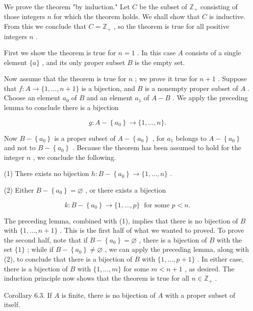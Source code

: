 \documentclass[10pt]{article}
\begin{document}
We prove the theorem "by induction." Let \(C\) be the subset of \({\mathbb{Z}}_{ + }\) consisting of those integers \(n\) for which the theorem holds. We shall show that \(C\) is inductive. From this we conclude that \(C = {\mathbb{Z}}_{ + }\) , so the theorem is true for all positive integers \(n\) .

First we show the theorem is true for \(n = 1\) . In this case \(A\) consists of a single element \(\{ a\}\) , and its only proper subset \(B\) is the empty set.

Now assume that the theorem is true for \(n\) ; we prove it true for \(n + 1\) . Suppose that \(f : A \rightarrow  \{ 1,\ldots ,n + 1\}\) is a bijection, and \(B\) is a nonempty proper subset of \(A\) . Choose an element \({a}_{0}\) of \(B\) and an element \({a}_{1}\) of \(A - B\) . We apply the preceding lemma to conclude there is a bijection

\[
g : A - \left\{  {a}_{0}\right\}   \rightarrow  \{ 1,\ldots ,n\} .
\]

Now \(B - \left\{  {a}_{0}\right\}\) is a proper subset of \(A - \left\{  {a}_{0}\right\}\) , for \({a}_{1}\) belongs to \(A - \left\{  {a}_{0}\right\}\) and not to \(B - \left\{  {a}_{0}\right\}\) . Because the theorem has been assumed to hold for the integer \(n\) , we conclude the following.

(1) There exists no bijection \(h : B - \left\{  {a}_{0}\right\}   \rightarrow  \{ 1,\ldots ,n\}\) .

(2) Either \(B - \left\{  {a}_{0}\right\}   = \varnothing\) , or there exists a bijection

\[
k : B - \left\{  {a}_{0}\right\}   \rightarrow  \{ 1,\ldots ,p\} \;\text{ for some }p < n.
\]

The preceding lemma, combined with (1), implies that there is no bijection of \(B\) with \(\{ 1,\ldots ,n + 1\}\) . This is the first half of what we wanted to proved. To prove the second half, note that if \(B - \left\{  {a}_{0}\right\}   = \varnothing\) , there is a bijection of \(B\) with the set \(\{ 1\}\) ; while if \(B - \left\{  {a}_{0}\right\}   \neq  \varnothing\) , we can apply the preceding lemma, along with (2), to conclude that there is a bijection of \(B\) with \(\{ 1,\ldots ,p + 1\}\) . In either case, there is a bijection of \(B\) with \(\{ 1,\ldots ,m\}\) for some \(m < n + 1\) , as desired. The induction principle now shows that the theorem is true for all \(n \in  {\mathbb{Z}}_{ + }\) .

Corollary 6.3. If \(A\) is finite, there is no bijection of \(A\) with a proper subset of itself.
\end{document}
